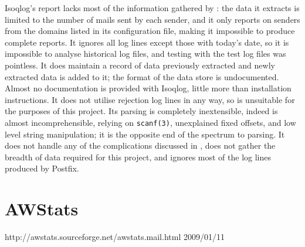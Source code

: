 Isoqlog's report lacks most of the information gathered by \parsername{}:
the data it extracts is limited to the number of mails sent by each sender,
and it only reports on senders from the domains listed in its configuration
file, making it impossible to produce complete reports.  It ignores all log
lines except those with today's date, so it is impossible to analyse
historical log files, and testing with the \numberOFlogFILES{} test log
files was pointless.  It does maintain a record of data previously
extracted and newly extracted data is added to it; the format of the data
store is undocumented.  Almost no documentation is provided with Isoqlog,
little more than installation instructions.  It does not utilise rejection
log lines in any way, so is unsuitable for the purposes of this project.
Its parsing is completely inextensible, indeed is almost incomprehensible,
relying on \texttt{scanf(3)}, unexplained fixed offsets, and low level
string manipulation; it is the opposite end of the spectrum to
\parsernames{} parsing.  It does not handle any of the complications
discussed in , does not gather the breadth of
data required for this project, and ignores most of the log lines produced
by Postfix.

\section{AWStats}

{http://awstats.sourceforge.net/awstats.mail.html}
{2009/01/11}

